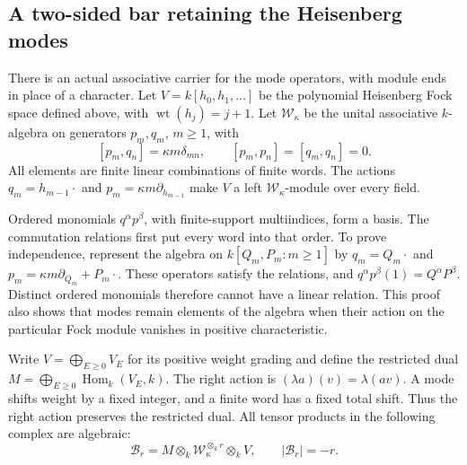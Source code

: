 \subsection{A two-sided bar retaining the Heisenberg modes}
\label{sec:mode-bar}

There is an actual associative carrier for the mode operators, with
module ends in place of a character.  Let
\(V=k[h_0,h_1,\ldots]\) be the polynomial Heisenberg Fock space
defined above, with \(\operatorname{wt}(h_j)=j+1\).
Let \(\mathscr W_\kappa\)
be the unital associative \(k\)-algebra on generators
\(p_m,q_m\), \(m\ge1\), with
\[
 [p_m,q_n]=\kappa m\delta_{mn},\qquad
 [p_m,p_n]=[q_m,q_n]=0.
\]
All elements are finite linear combinations of finite words.
The actions \(q_m=h_{m-1}\cdot\) and
\(p_m=\kappa m\partial_{h_{m-1}}\) make \(V\) a left
\(\mathscr W_\kappa\)-module over every field.

Ordered monomials \(q^\alpha p^\beta\), with finite-support
multiindices, form a basis.  The commutation relations first put every
word into that order.  To prove independence, represent the algebra
on \(k[Q_m,P_m:m\ge1]\) by
\(q_m=Q_m\cdot\) and \(p_m=\kappa m\partial_{Q_m}+P_m\cdot\).
These operators satisfy the relations, and
\(q^\alpha p^\beta(1)=Q^\alpha P^\beta\).
Distinct ordered monomials therefore cannot have a linear relation.
This proof also shows that modes remain elements of the algebra when
their action on the particular Fock module vanishes in positive characteristic.

Write \(V=\bigoplus_{E\ge0}V_E\) for its positive weight grading
and define the restricted dual
\(M=\bigoplus_{E\ge0}\operatorname{Hom}_k(V_E,k)\).
The right action is
\((\lambda a)(v)=\lambda(av)\).
A mode shifts weight by a fixed integer, and a finite word has a fixed
total shift.  Thus the right action preserves the restricted dual.
All tensor products in the following complex are algebraic:
\begin{equation}\label{mb:eq:mode-bar}
 \mathcal B_r=M\otimes_k\mathscr W_\kappa^{\otimes_k r}\otimes_k V,
 \qquad |\mathcal B_r|=-r.
\end{equation}

